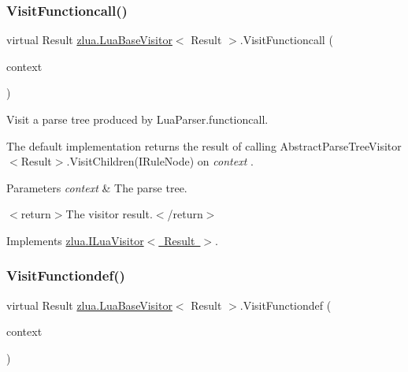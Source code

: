 \subsubsection{\texorpdfstring{Visit\+Functioncall()}{VisitFunctioncall()}}
{\footnotesize\ttfamily virtual Result \mbox{\hyperlink{classzlua_1_1_lua_base_visitor}{zlua.\+Lua\+Base\+Visitor}}$<$ Result $>$.Visit\+Functioncall (\begin{DoxyParamCaption}\item[{\mbox{[}\+Not\+Null\mbox{]} \mbox{\hyperlink{classzlua_1_1_lua_parser_1_1_functioncall_context}{Lua\+Parser.\+Functioncall\+Context}}}]{context }\end{DoxyParamCaption})\hspace{0.3cm}{\ttfamily [virtual]}}



Visit a parse tree produced by Lua\+Parser.\+functioncall. 

The default implementation returns the result of calling Abstract\+Parse\+Tree\+Visitor$<$\+Result$>$.\+Visit\+Children(\+I\+Rule\+Node) on {\itshape context} . 


\begin{DoxyParams}{Parameters}
{\em context} & The parse tree.\\
\hline
\end{DoxyParams}
$<$return$>$The visitor result.$<$/return$>$ 

Implements \mbox{\hyperlink{interfacezlua_1_1_i_lua_visitor_ac5b248028640e893638d96fee0463367}{zlua.\+I\+Lua\+Visitor$<$ Result $>$}}.

\mbox{\label{classzlua_1_1_lua_base_visitor_ae443f2f4b5993febf577b31721ba8588}} 
\subsubsection{\texorpdfstring{Visit\+Functiondef()}{VisitFunctiondef()}}
{\footnotesize\ttfamily virtual Result \mbox{\hyperlink{classzlua_1_1_lua_base_visitor}{zlua.\+Lua\+Base\+Visitor}}$<$ Result $>$.Visit\+Functiondef (\begin{DoxyParamCaption}\item[{\mbox{[}\+Not\+Null\mbox{]} \mbox{\hyperlink{classzlua_1_1_lua_parser_1_1_functiondef_context}{Lua\+Parser.\+Functiondef\+Context}}}]{context }\end{DoxyParamCaption})\hspace{0.3cm}{\ttfamily [virtual]}}



